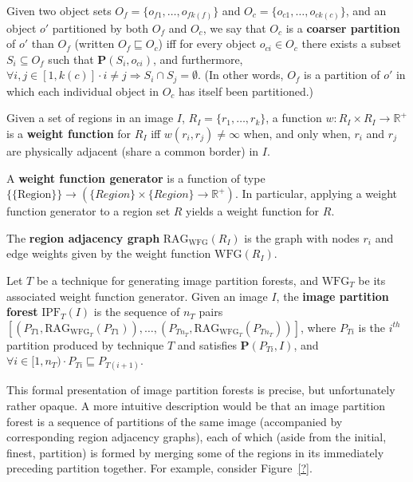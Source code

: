 \begin{definition}
Given two object sets $O_f = \{o_{f1},\ldots,o_{fk(f)}\}$ and $O_c = \{o_{c1},\ldots,o_{ck(c)}\}$, and an object $o'$ partitioned by both $O_f$ and $O_c$, we say that $O_c$ is a \textbf{coarser partition} of $o'$ than $O_f$ (written $O_f \sqsubseteq O_c$) iff for every object $o_{ci} \in O_c$ there exists a subset $S_i \subseteq O_f$ such that $\mathbf{P}(S_i, o_{ci})$, and furthermore, $\forall i,j \in [1,k(c)] \cdot i \ne j \Rightarrow S_i \cap S_j = \emptyset$. (In other words, $O_f$ is a partition of $o'$ in which each individual object in $O_c$ has itself been partitioned.)
\end{definition}

\begin{definition}
Given a set of regions in an image $I$, $R_I = \{r_1,\ldots,r_k\}$, a function $w : R_I \times R_I \rightarrow \mathbb{R}^{+}$ is a \textbf{weight function} for $R_I$ iff $w(r_i,r_j) \ne \infty$ when, and only when, $r_i$ and $r_j$ are physically adjacent (share a common border) in $I$.
\end{definition}

\begin{definition}
A \textbf{weight function generator} is a function of type $\{\{\mbox{Region}\}\} \rightarrow (\{Region\} \times \{Region\} \rightarrow \mathbb{R}^{+})$. In particular, applying a weight function generator to a region set $R$ yields a weight function for $R$.
\end{definition}

\begin{definition}
The \textbf{region adjacency graph} $\mbox{RAG}_{\mbox{WFG}}(R_I)$ is the graph with nodes $r_i$ and edge weights given by the weight function $\mbox{WFG}(R_I)$.
\end{definition}

\begin{definition}
Let $T$ be a technique for generating image partition forests, and $\mbox{WFG}_T$ be its associated weight function generator. Given an image $I$, the \textbf{image partition forest} $\mbox{IPF}_{T}(I)$ is the sequence of $n_T$ pairs $[(P_{T1},\mbox{RAG}_{\mbox{WFG}_T}(P_{T1})),\ldots,(P_{Tn_T},\mbox{RAG}_{\mbox{WFG}_T}(P_{Tn_T}))]$, where $P_{Ti}$ is the $i^{th}$ partition produced by technique $T$ and satisfies $\mathbf{P}(P_{Ti},I)$, and $\forall i \in [1,n_T) \cdot P_{Ti} \sqsubseteq P_{T(i+1)}$.
\end{definition}

This formal presentation of image partition forests is precise, but unfortunately rather opaque. A more intuitive description would be that an image partition forest is a sequence of partitions of the same image (accompanied by corresponding region adjacency graphs), each of which (aside from the initial, finest, partition) is formed by merging some of the regions in its immediately preceding partition together. For example, consider Figure~\ref{?}.